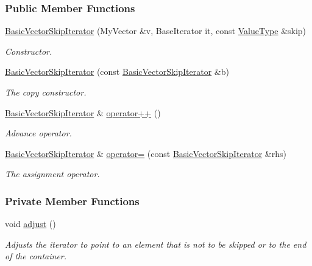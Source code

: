 \subsubsection*{Public Member Functions}
\begin{DoxyCompactItemize}
\item 
\hyperlink{structslb_1_1core_1_1util_1_1BasicVectorSkipIterator_aa46df09e95807f6b4bc749a84e13e2e5}{Basic\+Vector\+Skip\+Iterator} (My\+Vector \&v, Base\+Iterator it, const \hyperlink{structslb_1_1core_1_1util_1_1BasicVectorSkipIterator_afa39da0ab694b51d0abd089e7612a763}{Value\+Type} \&skip)
\begin{DoxyCompactList}\small\item\em Constructor. \end{DoxyCompactList}\item 
\hyperlink{structslb_1_1core_1_1util_1_1BasicVectorSkipIterator_ac265c697274c7d7791b1a7d8bf9a7370}{Basic\+Vector\+Skip\+Iterator} (const \hyperlink{structslb_1_1core_1_1util_1_1BasicVectorSkipIterator}{Basic\+Vector\+Skip\+Iterator} \&b)
\begin{DoxyCompactList}\small\item\em The copy constructor. \end{DoxyCompactList}\item 
\hyperlink{structslb_1_1core_1_1util_1_1BasicVectorSkipIterator}{Basic\+Vector\+Skip\+Iterator} \& \hyperlink{structslb_1_1core_1_1util_1_1BasicVectorSkipIterator_a3e4ab47663d9a7e1ef957162845e7653}{operator++} ()
\begin{DoxyCompactList}\small\item\em Advance operator. \end{DoxyCompactList}\item 
\hyperlink{structslb_1_1core_1_1util_1_1BasicVectorSkipIterator}{Basic\+Vector\+Skip\+Iterator} \& \hyperlink{structslb_1_1core_1_1util_1_1BasicVectorSkipIterator_a7c20091a03321d6e6b26f8bf16e4a037}{operator=} (const \hyperlink{structslb_1_1core_1_1util_1_1BasicVectorSkipIterator}{Basic\+Vector\+Skip\+Iterator} \&rhs)
\begin{DoxyCompactList}\small\item\em The assignment operator. \end{DoxyCompactList}\end{DoxyCompactItemize}
\subsubsection*{Private Member Functions}
\begin{DoxyCompactItemize}
\item 
void \hyperlink{structslb_1_1core_1_1util_1_1BasicVectorSkipIterator_a62b9c795de2c431982e105887b335f29}{adjust} ()\hypertarget{structslb_1_1core_1_1util_1_1BasicVectorSkipIterator_a62b9c795de2c431982e105887b335f29}{}\label{structslb_1_1core_1_1util_1_1BasicVectorSkipIterator_a62b9c795de2c431982e105887b335f29}

\begin{DoxyCompactList}\small\item\em Adjusts the iterator to point to an element that is not to be skipped or to the end of the container. \end{DoxyCompactList}\end{DoxyCompactItemize}
